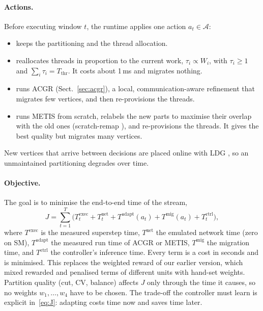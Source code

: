\paragraph{Actions.}
Before executing window $t$, the runtime applies one action $a_t\in\mathcal{A}$:
\begin{itemize}
  \item \NOA{} keeps the partitioning and the thread allocation.
  \item \TA{} reallocates threads in proportion to the current work, $\tau_i\propto W_i$, with
        $\tau_i\ge 1$ and $\sum_i \tau_i=T_{\mathrm{thr}}$. It costs about 1\,ms and migrates nothing.
  \item \RB{} runs ACGR (Sect.~\ref{sec:acgr}), a local, communication-aware refinement that
        migrates few vertices, and then re-provisions the threads.
  \item \RP{} runs METIS \cite{karypis1998metis} from scratch, relabels the new parts to maximise
        their overlap with the old ones (scratch-remap \cite{schloegel2000unified}), and
        re-provisions the threads. It gives the best quality but migrates many vertices.
\end{itemize}
New vertices that arrive between decisions are placed online with LDG \cite{stanton2012ldg},
so an unmaintained partitioning degrades over time.

\paragraph{Objective.}
The goal is to minimise the end-to-end time of the stream,
\begin{equation}\label{eq:J}
  J = \sum_{t=1}^{T} \Big( T^{\mathrm{exec}}_t + T^{\mathrm{net}}_t
      + T^{\mathrm{adapt}}(a_t) + T^{\mathrm{mig}}(a_t) + T^{\mathrm{ctrl}}_t \Big),
\end{equation}
where $T^{\mathrm{exec}}$ is the measured superstep time, $T^{\mathrm{net}}$ the emulated network
time (zero on SM), $T^{\mathrm{adapt}}$ the measured run time of ACGR or METIS,
$T^{\mathrm{mig}}$ the migration time, and $T^{\mathrm{ctrl}}$ the controller's inference time.
Every term is a cost in seconds and is minimised. This replaces the weighted reward of our
earlier version, which mixed rewarded and penalised terms of different units with hand-set
weights. Partition quality (cut, CV, balance) affects $J$ only through the time it causes, so
no weights $w_1,\dots,w_4$ have to be chosen. The trade-off the controller must learn is
explicit in~\eqref{eq:J}: adapting costs time now and saves time later.
